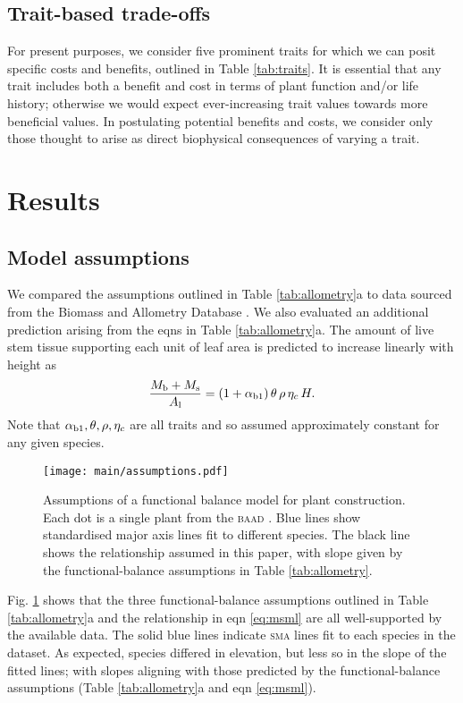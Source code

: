 \documentclass[9pt,twocolumn,twoside]{pnas-new}
\newcommand{\sma}{\textsc{sma}}
\begin{document}
\subsection{Trait-based trade-offs}

For present purposes, we consider five prominent traits for which we can posit specific costs and benefits, outlined in Table \ref{tab:traits}. It is essential that any trait includes both a benefit and cost in terms of plant function and/or life history; otherwise we would expect ever-increasing trait values towards more beneficial values. In postulating potential benefits and costs, we consider only those thought to arise as direct biophysical consequences of varying a trait.

\section*{Results}

\subsection{Model assumptions}

We compared the assumptions outlined in Table \ref{tab:allometry}a to data sourced from the Biomass and Allometry Database \citep[\textsc{baad}][]{Falster-2015b}. We also evaluated an additional prediction arising from the eqns in Table \ref{tab:allometry}a. The amount of live stem tissue supporting each unit of leaf area is predicted to increase linearly with height as
\begin{equation}\label{eq:msml}
\frac{M_{\rm b} + M_{\rm s}}{A_{\rm l}} = (1+ \alpha_{\rm b1}) \,\theta \, \rho \, \eta_c \, H.
\end{equation}
Note that $\alpha_{\rm b1}, \theta, \rho, \eta_c$ are all traits and so assumed approximately constant for any given species.


\begin{figure}[!hb]
\centering
\texttt{[image: main/assumptions.pdf]}
\caption{Assumptions of a functional balance model for plant construction.
Each dot is a single plant from the \textsc{baad} \citep{Falster-2015b}.
Blue lines show standardised major axis lines fit to different species. The black line shows the relationship assumed in this paper, with slope given by the functional-balance assumptions in Table \ref{tab:allometry}.
}
\label{fig:assumptions}
\end{figure}


Fig. \ref{fig:assumptions} shows that the three functional-balance assumptions outlined in Table \ref{tab:allometry}a and the relationship in eqn \ref{eq:msml} are all well-supported by the available data. The solid blue lines indicate {\sma} lines fit to each species in the dataset. As expected, species differed in elevation, but less so in the slope of the fitted lines; with slopes aligning with those predicted by the functional-balance assumptions (Table \ref{tab:allometry}a and eqn \ref{eq:msml}).
\end{document}
